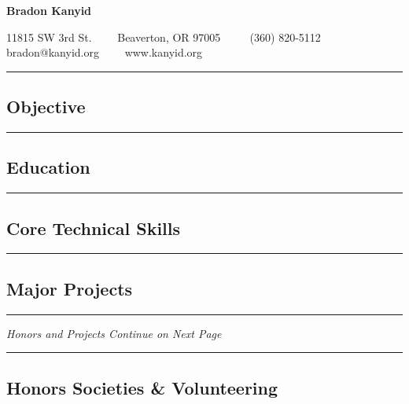 \documentclass[10pt,letterpaper]{article}
\begin{document}
\begin{center}
{\LARGE \textbf{Bradon Kanyid}}

11815 SW 3rd St.\ \ \textbullet
\ \ Beaverton, OR 97005 \ \ \textbullet
\ \ (360) 820-5112\\
bradon@kanyid.org\ \ \textbullet
\ \ www.kanyid.org
\end{center}

\hrule
\vspace{-0.4em}
\subsection*{Objective}

\vspace{1em}

\hrule
\vspace{-0.4em}
\subsection*{Education}

\vspace{1em}

\hrule
\vspace{-0.4em}
\subsection*{Core Technical Skills}

\vspace{1em}

\hrule
\vspace{-0.4em}
\subsection*{Major Projects}
\begin{itemize}
  
  
  
  
  
\end{itemize}

\hrule
\begin{center}
{\emph{Honors and Projects Continue on Next Page}}

\end{center}

\newpage

\hrule
\vspace{-0.4em}
\subsection*{Honors Societies \& Volunteering}
\begin{itemize}
  
  
  
\end{itemize}
\end{document}
